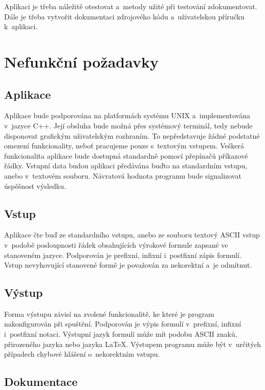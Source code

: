\documentclass[thesis=B,czech,hidelinks]{thesis}[2012/06/26]
\begin{document}
Aplikaci je třeba náležitě otestovat a~metody užité při testování zdokumentovat. Dále je třeba vytvořit dokumentaci zdrojového kódu a~uživatelskou příručku k~aplikaci.

\section{Nefunkční požadavky}

\subsection{Aplikace}

Aplikace bude podporována na platformách systému UNIX a~implementována v~jazyce C++. Její obsluha bude možná přes systémový terminál, tedy nebude disponovat grafickým uživatelským rozhraním. To nepředstavuje žádné podstatné omezení funkcionality, neboť pracujeme pouze s~textovým vstupem. Veškerá funkcionalita aplikace bude dostupná standardně pomocí přepínačů příkazové řádky. Vstupní data budou aplikaci předávána buďto na standardním vstupu, anebo v~textovém souboru. Návratová hodnota programu bude signalizovat úspěšnost výsledku.

\subsection{Vstup}

Aplikace čte buď ze standardního vstupu, anebo ze souboru textový ASCII vstup v~podobě posloupnosti řádek obsahujících výrokové formule zapsané ve stanoveném jazyce. Podporován je prefixní, infixní i~postfixní zápis formulí. Vstup nevyhovující stanovené formě je považován za nekorektní a~je odmítnut.

\subsection{Výstup}

Forma výstupu závisí na zvolené funkcionalitě, ke které je program nakonfigurován při spuštění. Podporován je výpis formulí v~prefixní, infixní i~postfixní notaci. Výstupní jazyk formulí může mít podobu ASCII znaků, přirozeného jazyka nebo jazyka \LaTeX. Výstupem programu může být v~určitých případech chybové hlášení o~nekorektním vstupu.

\subsection{Dokumentace}
\end{document}
